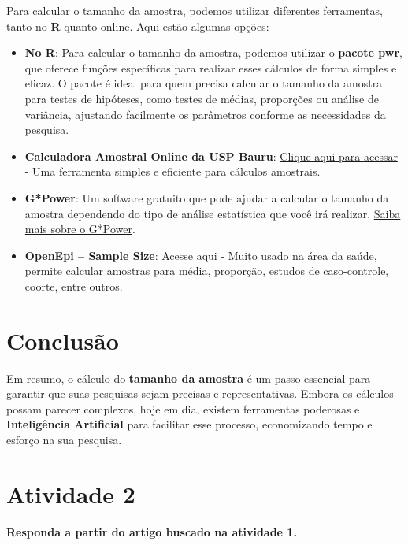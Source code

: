 \documentclass[
]{book}
\begin{document}
Para calcular o tamanho da amostra, podemos utilizar diferentes ferramentas, tanto no \textbf{R} quanto online. Aqui estão algumas opções:

\begin{itemize}
\item
  \textbf{No R}: Para calcular o tamanho da amostra, podemos utilizar o \textbf{pacote pwr}, que oferece funções específicas para realizar esses cálculos de forma simples e eficaz. O pacote é ideal para quem precisa calcular o tamanho da amostra para testes de hipóteses, como testes de médias, proporções ou análise de variância, ajustando facilmente os parâmetros conforme as necessidades da pesquisa.
\item
  \textbf{Calculadora Amostral Online da USP Bauru}: \href{http://estatistica.bauru.usp.br/calculoamostral/}{Clique aqui para acessar} - Uma ferramenta simples e eficiente para cálculos amostrais.
\item
  \textbf{G*Power}: Um software gratuito que pode ajudar a calcular o tamanho da amostra dependendo do tipo de análise estatística que você irá realizar. \href{https://www.gpower.hhu.de/en.html}{Saiba mais sobre o G*Power}.
\item
  \textbf{OpenEpi -- Sample Size}: \href{https://www.openepi.com/SampleSize/SSMean.htm}{Acesse aqui} - Muito usado na área da saúde, permite calcular amostras para média, proporção, estudos de caso-controle, coorte, entre outros.
\end{itemize}

\section{Conclusão}\label{conclusuxe3o}

Em resumo, o cálculo do \textbf{tamanho da amostra} é um passo essencial para garantir que suas pesquisas sejam precisas e representativas. Embora os cálculos possam parecer complexos, hoje em dia, existem ferramentas poderosas e \textbf{Inteligência Artificial} para facilitar esse processo, economizando tempo e esforço na sua pesquisa.

\section{Atividade 2}\label{atividade-2}

\textbf{Responda a partir do artigo buscado na atividade 1.}
\end{document}
